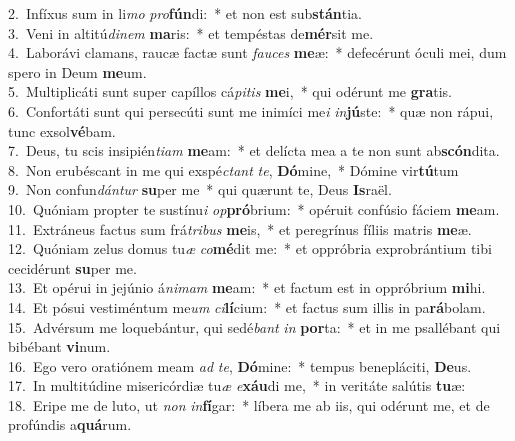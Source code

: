 {2.~}Infíxus sum in li\textit{mo} \textit{pro}\textbf{fún}di:~* et non est sub\textbf{stán}tia.\\
{3.~}Veni in altitú\textit{di}\textit{nem} \textbf{ma}ris:~* et tempéstas de\textbf{mér}sit me.\\
{4.~}Laborávi clamans, raucæ factæ sunt \textit{fau}\textit{ces} \textbf{me}æ:~* defecérunt óculi mei, dum spero in Deum \textbf{me}um.\\
{5.~}Multiplicáti sunt super capíllos cá\textit{pi}\textit{tis} \textbf{me}i,~* qui odérunt me \textbf{gra}tis.\\
{6.~}Confortáti sunt qui persecúti sunt me inimíci me\textit{i} \textit{in}\textbf{jú}ste:~* quæ non rápui, tunc exsol\textbf{vé}bam.\\
{7.~}Deus, tu scis insipién\textit{ti}\textit{am} \textbf{me}am:~* et delícta mea a te non sunt ab\textbf{scón}dita.\\
{8.~}Non erubéscant in me qui exspé\textit{ctant} \textit{te}, \textbf{Dó}mine,~* Dómine vir\textbf{tú}tum\\
{9.~}Non confun\textit{dán}\textit{tur} \textbf{su}per me~* qui quærunt te, Deus \textbf{Is}raël.\\
{10.~}Quóniam propter te sustínu\textit{i} \textit{op}\textbf{pró}brium:~* opéruit confúsio fáciem \textbf{me}am.\\
{11.~}Extráneus factus sum frá\textit{tri}\textit{bus} \textbf{me}is,~* et peregrínus fíliis matris \textbf{me}æ.\\
{12.~}Quóniam zelus domus tu\textit{æ} \textit{co}\textbf{mé}dit me:~* et oppróbria exprobrántium tibi cecidérunt \textbf{su}per me.\\
{13.~}Et opérui in jejúnio á\textit{ni}\textit{mam} \textbf{me}am:~* et factum est in oppróbrium \textbf{mi}hi.\\
{14.~}Et pósui vestiméntum me\textit{um} \textit{ci}\textbf{lí}cium:~* et factus sum illis in pa\textbf{rá}bolam.\\
{15.~}Advérsum me loquebántur, qui sedé\textit{bant} \textit{in} \textbf{por}ta:~* et in me psallébant qui bibébant \textbf{vi}num.\\
{16.~}Ego vero oratiónem meam \textit{ad} \textit{te}, \textbf{Dó}mine:~* tempus benepláciti, \textbf{De}us.\\
{17.~}In multitúdine misericórdiæ tu\textit{æ} \textit{e}\textbf{xáu}di me,~* in veritáte salútis \textbf{tu}æ:\\
{18.~}Eripe me de luto, ut \textit{non} \textit{in}\textbf{fí}gar:~* líbera me ab iis, qui odérunt me, et de profúndis a\textbf{quá}rum.\\
